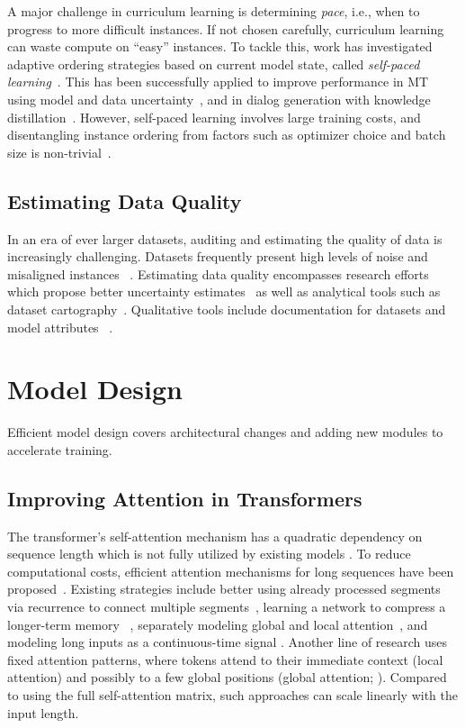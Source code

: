 A major challenge in curriculum learning is determining \textit{pace}, i.e., when to progress to more difficult instances. If not chosen carefully, curriculum learning can waste compute on ``easy'' instances. To tackle this, work has investigated adaptive ordering strategies based on current model state, called \textit{self-paced learning}~\citep{kumar2010self}. This has been successfully applied to improve performance in MT using model and data uncertainty~\citep{wan-etal-2020-self,zhou-etal-2020-uncertainty, zhao2020reinforced}, and in dialog generation with knowledge distillation~\citep{zhu-etal-2021-combining-curriculum-learning}. However, self-paced learning involves large training costs, and disentangling instance ordering from factors such as optimizer choice and batch size is non-trivial~\citep{Dodge:2020}.

\subsection{Estimating Data Quality}

In an era of ever larger datasets, auditing and estimating the quality of data is increasingly challenging. Datasets frequently present high levels of noise and misaligned instances ~\citep{kreutzer-etal-2022-quality}. Estimating data quality encompasses research efforts which propose better uncertainty estimates~\citep{baldock2021, souza2021, ethayarajh2022understanding} as well as analytical tools such as dataset cartography~\citep{swayamdipta-etal-2020-dataset}. Qualitative tools include documentation for datasets and model attributes ~\citep{gebru2021datasheets}.

\section{Model Design}  \label{sec:model_design}
Efficient model design covers architectural changes and adding new modules to accelerate training.

\subsection{Improving Attention in Transformers}\label{sec:attention}
The transformer's self-attention mechanism has a quadratic dependency on sequence length which is not fully utilized by existing models \cite{Hassid:2022}. To reduce computational costs, efficient attention mechanisms for long sequences have been proposed~\citep{tay2020efficient}. Existing strategies include better using already processed segments via recurrence to connect multiple segments~\citep{dai2019transformer}, learning a network to compress a longer-term memory~ \citep{rae2019compressive}, separately modeling global and local attention~\citep{ravula_etc_2020}, and modeling long inputs as a continuous-time signal \citep{martins2022infty}. Another line of research uses fixed attention patterns, where tokens attend to their immediate context (local attention) and possibly to a few global positions (global attention; \citealp{beltagy_longformer_2020,zaheer2020big, child_generating_2019}). Compared to using the full self-attention matrix, such approaches can scale linearly with the input length. 

